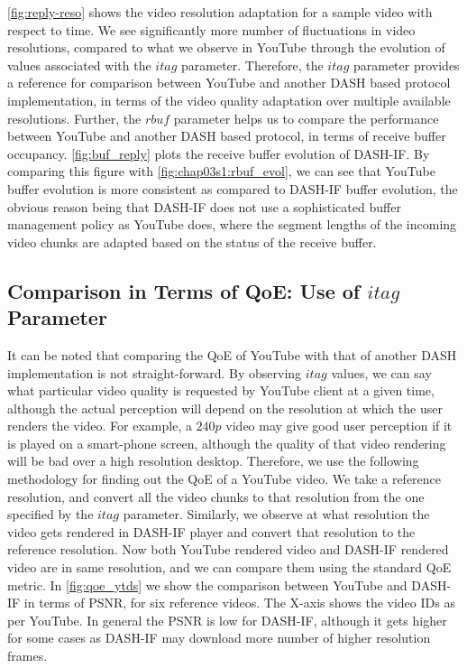 \fig\ref{fig:reply-reso} shows the video resolution adaptation for a sample video with respect to time. We see significantly more number of fluctuations in video resolutions, compared to what we observe in YouTube through the evolution of values associated with the $itag$ parameter. Therefore, the $itag$ parameter provides a reference for comparison between YouTube and another \ac{DASH} based protocol implementation, in terms of the video quality adaptation over multiple available resolutions. Further, the $rbuf$ parameter helps us to compare the performance between YouTube and another \ac{DASH} based protocol, in terms of receive buffer occupancy. \fig\ref{fig:buf_reply} plots the receive buffer evolution of \ac{DASH-IF}. By comparing this figure with \fig\ref{fig:chap03s1:rbuf_evol}, we can see that YouTube buffer evolution is more consistent as compared to \ac{DASH-IF} buffer evolution, the obvious reason being that \ac{DASH-IF} does not use a sophisticated buffer management policy as YouTube does, where the segment lengths of the incoming video chunks are adapted based on the status of the receive buffer.

%
%
\subsection{Comparison in Terms of QoE: Use of $itag$ Parameter}

It can be noted that comparing the \ac{QoE} of YouTube with that of another \ac{DASH} implementation is not straight-forward. By observing $itag$ values, we can say what particular video quality is requested by YouTube client at a given time, although the actual perception will depend on the resolution at which the user renders the video. For example, a $240p$ video may give good user perception if it is played on a smart-phone screen, although the quality of that video rendering will be bad over a high resolution desktop. Therefore, we use the following methodology for finding out the \ac{QoE} of a YouTube video. We take a reference resolution, and convert all the video chunks to that resolution from the one specified by the $itag$ parameter. Similarly, we observe at what resolution the video gets rendered in \ac{DASH-IF} player and convert that resolution to the reference resolution. Now both YouTube rendered video and \ac{DASH-IF} rendered video are in same resolution, and we can compare them using the standard \ac{QoE} metric. In \fig\ref{fig:qoe_ytds} we show the comparison between YouTube and \ac{DASH-IF} in terms of \ac{PSNR}, for six reference videos. The X-axis shows the video IDs as per YouTube. In general the \ac{PSNR} is low for \ac{DASH-IF}, although it gets higher for some cases as \ac{DASH-IF} may download more number of higher resolution frames.

